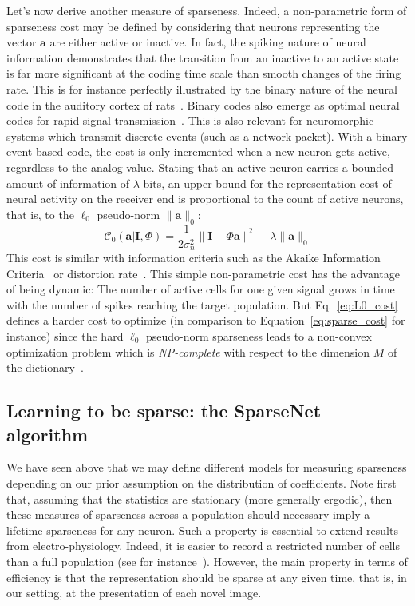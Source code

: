 \documentclass[a4paper, 11pt]{book}
\newcommand{\image}{\mathbf{I}} %
\newcommand{\dico}{\Phi} %
\newcommand{\coef}{\mathbf{a}} %
\newcommand{\seeEq}[1]{Eq.~\ref{eq:#1}}%
\begin{document}
Let's now derive another measure of sparseness.
Indeed, a non-parametric form of sparseness cost may be defined by considering that neurons representing the vector $\coef$ are either active or inactive.
In fact, the spiking nature of neural information demonstrates that the transition from an inactive to an active state is far more significant at the coding time scale than smooth changes of the firing rate. This is for instance perfectly illustrated by the binary nature of the neural code in the auditory cortex of rats~\citep{Deweese03}. Binary codes also emerge as optimal neural codes for rapid signal transmission~\citep{Bethge03,Nikitin09}. This is also relevant for neuromorphic systems which transmit discrete events (such as a network packet). With a binary event-based code, the cost is only incremented when a new neuron gets active, regardless to the analog value. Stating that an active neuron carries a bounded amount of information of $\lambda$ bits, an upper bound for the representation cost of neural activity on the receiver end is proportional to the count of active neurons, that is, to the $\ell_0$ pseudo-norm $\| \coef \|_0$:%
\begin{equation}%
\mathcal{C}_0( \coef | \image , \dico) = \frac{1}{2\sigma_n^2} \| \image - \dico \coef \|^2 + \lambda \| \coef \|_0%
\label{eq:L0_cost}%
\end{equation}%
This cost is similar with information criteria such as the Akaike Information Criteria~\citep{Akaike74} or distortion rate~\citep[p.~571]{Mallat98}. This simple non-parametric cost has the advantage of being dynamic: The number of active cells for one given signal grows in time with the number of spikes reaching the target population. But \seeEq{L0_cost} defines a harder cost to optimize (in comparison to Equation~\ref{eq:sparse_cost} for instance) since the hard $\ell_0$ pseudo-norm sparseness leads to a non-convex optimization problem which is \emph{NP-complete} with respect to the dimension $M$ of the dictionary~\citep[p.~418]{Mallat98}.%

\subsection{Learning to be sparse: the SparseNet algorithm}
We have seen above that we may define different models for measuring sparseness depending on our prior assumption on the distribution of coefficients.
Note first that, assuming that the statistics are stationary (more generally ergodic), then these measures of sparseness across a population should necessary imply a lifetime sparseness for any neuron.
Such a property is essential to extend results from electro-physiology.
Indeed, it is easier to record a restricted number of cells
than a full population (see for instance~\citep{Willmore11}).
However, the main property in terms of efficiency  is that the representation should be sparse at any given time,
that is, in our setting, at the presentation of each novel image.
\end{document}
